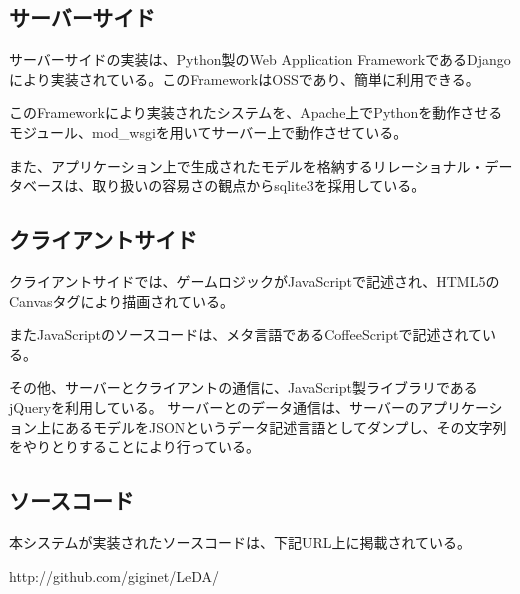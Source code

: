 \subsection{サーバーサイド}
サーバーサイドの実装は、Python製のWeb Application FrameworkであるDjangoにより実装されている。このFrameworkはOSSであり、簡単に利用できる。

このFrameworkにより実装されたシステムを、Apache上でPythonを動作させるモジュール、mod\_wsgiを用いてサーバー上で動作させている。

また、アプリケーション上で生成されたモデルを格納するリレーショナル・データベースは、取り扱いの容易さの観点からsqlite3を採用している。

\subsection{クライアントサイド}
クライアントサイドでは、ゲームロジックがJavaScriptで記述され、HTML5のCanvasタグにより描画されている。

またJavaScriptのソースコードは、メタ言語であるCoffeeScriptで記述されている。

その他、サーバーとクライアントの通信に、JavaScript製ライブラリであるjQueryを利用している。
サーバーとのデータ通信は、サーバーのアプリケーション上にあるモデルをJSONというデータ記述言語としてダンプし、その文字列をやりとりすることにより行っている。

\subsection{ソースコード}
本システムが実装されたソースコードは、下記URL上に掲載されている。

http://github.com/giginet/LeDA/
